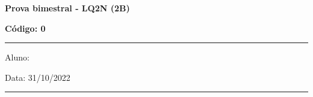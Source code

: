 \documentclass[12pt, addpoints]{exam}
\begin{document}
        \begin{minipage}[l]{0.75\linewidth}
            \begin{flushleft}
                {\bf \Large Prova bimestral - LQ2N (2B)}
            \end{flushleft}
        \end{minipage}
        \begin{minipage}[r]{0.20\linewidth}
            \begin{flushright}
                {\bf \Large Código: 0}
            \end{flushright}
        \end{minipage}
        \vspace{0.5cm} \hrule \vspace{0.5cm}
        \begin{minipage}{0.75\linewidth}
            Aluno:
        \end{minipage}
        \begin{minipage}{0.20\linewidth}
            Data: 31/10/2022
        \end{minipage}
        \vspace{0.5cm} \hrule \vspace{0.5cm}
\end{document}

